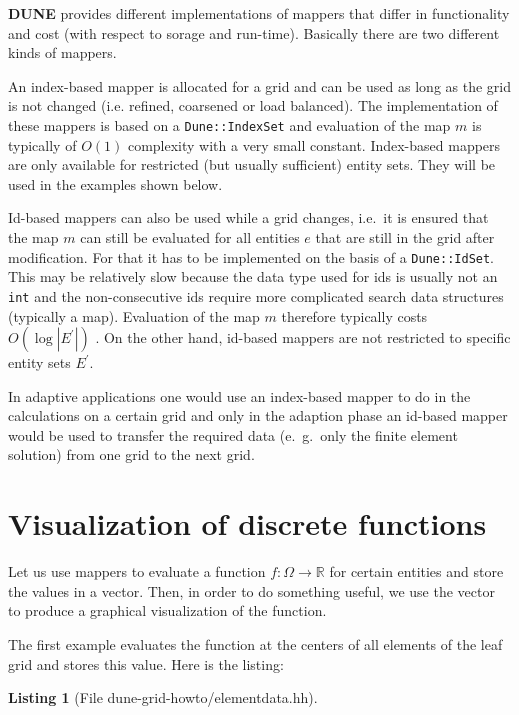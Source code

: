 \documentclass[11pt,a4paper,headinclude,footinclude,DIV16,normalheadings]{scrreprt}
\newcommand{\Dune}{{\sf\bfseries DUNE}\xspace}
\newtheorem{lst}{Listing}
\begin{document}
\Dune{} provides different implementations of mappers that differ in
functionality and cost (with respect to sorage and
run-time). Basically there are two different kinds of mappers. 


An index-based mapper is allocated for a grid and can be used as long
as the grid is not changed (i.e. refined, coarsened or load
balanced). The implementation of these mappers is based on a
\lstinline!Dune::IndexSet! and evaluation of the map $m$ is typically
of $O(1)$ complexity with a very small constant. 
Index-based mappers are only available for restricted (but
usually sufficient) entity sets. They will be used in the examples
shown below. 


Id-based mappers can also be used while a grid changes, i.e.~it is
ensured that the map $m$ can still be evaluated for all entities $e$
that are still in the grid after modification. For that it
has to be implemented on the basis of a \lstinline!Dune::IdSet!. This may be
relatively slow because the data type used for ids is usually not an
\lstinline!int! and the non-consecutive ids require more complicated search data
structures (typically a map). Evaluation of the map $m$ therefore
typically costs $O(\log |E^\prime|)$ . On the other hand, id-based
mappers are not restricted to specific entity sets $E^\prime$. 

In adaptive applications one would use an index-based mapper to do in
the calculations on a certain grid and only in the adaption phase an
id-based mapper would be used to transfer the required data
(e.~g.~only the finite element solution) from one grid to the next grid.

\section{Visualization of discrete functions}

Let us use mappers to evaluate a function $f:\Omega\to\mathbb{R}$ for
certain entities and store the values in a vector. Then, in order to
do something useful, we use the vector to produce a graphical
visualization of the function.

The first example evaluates the function at the centers of all
elements of the leaf grid and stores this value. Here is the listing:

\begin{lst}[File dune-grid-howto/elementdata.hh] \mbox{}
\nopagebreak

\end{lst}
\end{document}
